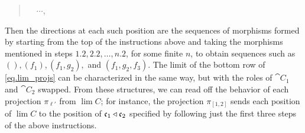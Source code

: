 \documentclass[Book-Poly]{subfiles}
\begin{document}
\begin{example}
\begin{quote}
\begin{enumerate}[label=1.\arabic*.]
\begin{enumerate}[label=2.\arabic*.]
\begin{enumerate}[label=3.\arabic*.]
            $\quad \cdots$,
        \end{enumerate}
    \end{enumerate}
\end{enumerate}
\end{quote}
Then the directions at each such position are the sequences of morphisms formed by starting from the top of the instructions above and taking the morphisms mentioned in steps $1.2, 2.2, \ldots, n.2$, for some finite $n$, to obtain sequences such as $(), (f_1), (f_1, g_2),$ and $(f_1, g_2, f_3)$.
The limit of the bottom row of \eqref{eq.lim_projs} can be characterized in the same way, but with the roles of $\cat{C}_1$ and $\cat{C}_2$ swapped.
From these structures, we can read off the behavior of each projection $\pi_{\ell'}$ from $\lim C$; for instance, the projection $\pi_{[1,2]}$ sends each position of $\lim C$ to the position of $\mathfrak{c}_1 \mathbin{\triangleleft} \mathfrak{c}_2$ specified by following just the first three steps of the above instructions.


\end{example}
\end{document}
